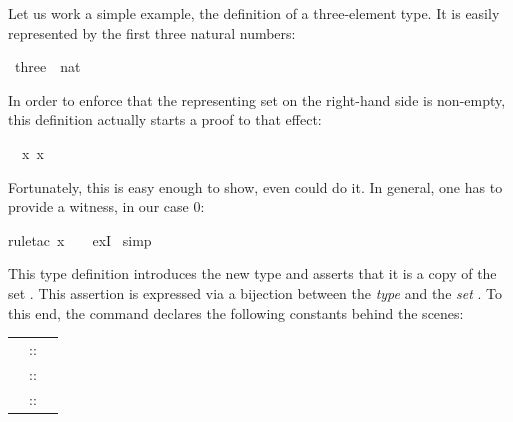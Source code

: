 \begin{isabellebody}
\begin{isamarkuptext}
Let us work a simple example, the definition of a three-element type.
It is easily represented by the first three natural numbers:%
\end{isamarkuptext}%
\isamarkupfalse%
\ three\ {\isacharequal}\ {\isachardoublequote}{\isacharbraceleft}{}{\isacharcolon}{\isacharcolon}nat{\isacharcomma}\ {}{\isacharcomma}\ {}{\isacharbraceright}{\isachardoublequote}%
\isadelimproof
%
\endisadelimproof
%
\isatagproof
\isamarkuptrue%
%
\begin{isamarkuptxt}%
\noindent
In order to enforce that the representing set on the right-hand side is
non-empty, this definition actually starts a proof to that effect:
\begin{isabelle}%
\ {}{\isachardot}\ {\isasymexists}x{\isachardot}\ x\ {\isasymin}\ {\isacharbraceleft}{}{\isacharcomma}\ {}{\isacharcomma}\ {}{\isacharbraceright}%
\end{isabelle}
Fortunately, this is easy enough to show, even  could do it.
In general, one has to provide a witness, in our case 0:%
\end{isamarkuptxt}%
\isamarkupfalse%
rule{\isacharunderscore}tac\ x\ {\isacharequal}\ {}\ \ exI{\isacharparenright}\isanewline
\isamarkupfalse%
\ simp%
\endisatagproof
{\isafoldproof}%
%
\isadelimproof
%
\endisadelimproof
\isamarkuptrue%
%
\begin{isamarkuptext}%
This type definition introduces the new type  and asserts
that it is a copy of the set . This assertion
is expressed via a bijection between the \emph{type}  and the
\emph{set} . To this end, the command declares the following
constants behind the scenes:
\begin{center}
\begin{tabular}{rcl}
\isa{three} &::& \isa{nat\ set} \\
\isa{Rep{\isacharunderscore}three} &::& \isa{three\ {\isasymRightarrow}\ nat}\\
\isa{Abs{\isacharunderscore}three} &::& \isa{nat\ {\isasymRightarrow}\ three}
\end{tabular}
\end{center}

\end{isamarkuptext}
\end{isabellebody}
